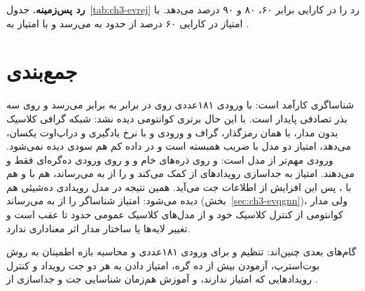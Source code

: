 \begin{table}[H]
\centering
\caption{تغییر ساختار مدار  رویدادی:  گروهی آزمون بدون امتیاز و با امتیاز ؛ بازه اطمینان ۹۵ درصد در کروشه.}
\label{tab:ch3-ev2}
\small

\end{table}

\textbf{رد پس‌زمینه.} جدول~\ref{tab:ch3-evrej} رد \ttbb را در کارایی \ttZ برابر ۶۰، ۸۰ و ۹۰ درصد می‌دهد. با امتیاز  در کارایی ۶۰ درصد از حدود  به  می‌رسد و با امتیاز  به .

\begin{table}[H]
\centering
\caption{رد پس‌زمینه \ttbb در کارایی سیگنال \ttZ ثابت، برای مدل رویدادی؛ بازه اطمینان ۹۵ درصد (بوت‌استرپ) در کروشه.}
\label{tab:ch3-evrej}
\small

\end{table}

\section{جمع‌بندی}
\label{sec:ch3-summary}
 شناساگری کارآمد است: با ورودی ۱۸۱‌عددی روی \Zjet در برابر \bbbb به  برابر  می‌رسد و روی سه بذر تصادفی پایدار است. با این حال برتری کوانتومی دیده نشد: شبکه گرافی کلاسیک بدون مدار، با همان رمزگذار، گراف و ورودی و با نرخ یادگیری و دراپ‌اوت یکسان،  می‌دهد، امتیاز دو مدل با ضریب  همبسته است و در داده کم هم سودی دیده نمی‌شود. ورودی مهم‌تر از مدل است:  و  روی ذره‌های خام  و  و روی ورودی ده‌گره‌ای  فقط  و  می‌دهند. امتیاز  به جداسازی رویدادهای \ttZ از \ttbb کمک می‌کند و  را از  به  می‌رساند، هم با  و هم با ، پس این افزایش از اطلاعات جت می‌آید. همین نتیجه در مدل رویدادی ده‌شیئی هم دیده می‌شود: امتیاز شناساگر  را از  به  می‌رساند (بخش~\ref{sec:ch3-evqgnn})، ولی مدار کوانتومی از کنترل کلاسیک خود و از مدل‌های کلاسیک عمومی حدود  تا  عقب است و تغییر لایه‌ها یا ساختار مدار اثر معناداری ندارد.

گام‌های بعدی چنین‌اند: تنظیم  و  برای ورودی ۱۸۱‌عددی و محاسبه بازه اطمینان به روش بوت‌استرپ، آزمودن بیش از ده گره، امتیاز دادن به هر دو جت رویداد و کنترل رویدادهایی که امتیاز ندارند، و آموزش هم‌زمان شناسایی جت و جداسازی \ttZ از \ttbb.

